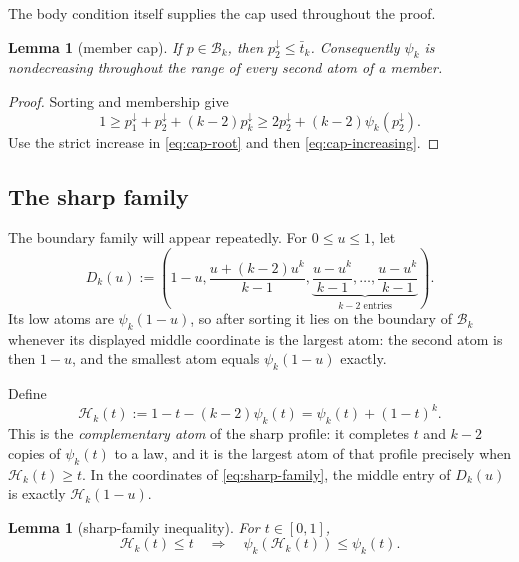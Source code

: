 \documentclass[11pt]{article}
\newtheorem{lemma}[theorem]{Lemma}
\theoremstyle{definition}
\theoremstyle{remark}
\newcommand{\body}{\mathcal{B}}
\newcommand{\down}{\downarrow}
\begin{document}
The body condition itself supplies the cap used throughout the proof.

\begin{lemma}[member cap]\label{lem:member-cap}
If $p\in\body_k$, then $p_2^\down\le\bar t_k$.  Consequently $\psi_k$
is nondecreasing throughout the range of every second atom of a member.
\end{lemma}

\begin{proof}
Sorting and membership give
\[
  1\ge p_1^\down+p_2^\down+(k-2)p_k^\down
   \ge2p_2^\down+(k-2)\psi_k(p_2^\down).
\]
Use the strict increase in \eqref{eq:cap-root} and then
\eqref{eq:cap-increasing}.
\end{proof}


\subsection{The sharp family}\label{subsec:sharp}

The boundary family will appear repeatedly.  For $0\le u\le1$, let
\begin{equation}\label{eq:sharp-family}
 D_k(u):=\left(1-u,
 \frac{u+(k-2)u^k}{k-1},
 \underbrace{\frac{u-u^k}{k-1},\ldots,
 \frac{u-u^k}{k-1}}_{k-2\text{ entries}}\right).
\end{equation}
Its low atoms are $\psi_k(1-u)$, so after sorting it lies on the boundary of
$\body_k$ whenever its displayed middle coordinate is the largest atom: the
second atom is then $1-u$, and the smallest atom equals $\psi_k(1-u)$
exactly.

Define
\begin{equation}\label{eq:sharp-H}
 \mathcal H_k(t):=1-t-(k-2)\psi_k(t)
 =\psi_k(t)+(1-t)^k.
\end{equation}
This is the \emph{complementary atom} of the sharp profile: it completes
$t$ and $k-2$ copies of $\psi_k(t)$ to a law, and it is the largest atom of
that profile precisely when $\mathcal H_k(t)\ge t$.  In the coordinates of
\eqref{eq:sharp-family}, the middle entry of $D_k(u)$ is exactly
$\mathcal H_k(1-u)$.

\begin{lemma}[sharp-family inequality]\label{lem:sharp-family}
For $t\in[0,1]$,
\begin{equation}\label{eq:SF}
 \mathcal H_k(t)\le t
 \quad\Longrightarrow\quad
 \psi_k(\mathcal H_k(t))\le\psi_k(t).
\end{equation}
\end{lemma}
\end{document}
